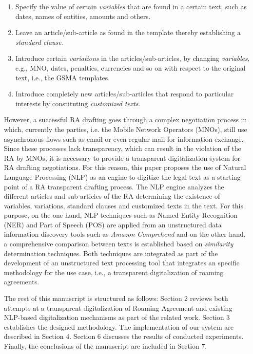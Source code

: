 \documentclass[conference]{style/IEEEtran}
\begin{document}
\begin{enumerate}
\item Specify the value of certain \textit{variables} that are found in a certain text, such as dates, names of entities, amounts and others.

\item Leave an article/sub-article as found in the template thereby establishing a \textit{standard clause}.

\item Introduce certain \textit{variations} in the articles/sub-articles, by changing \textit{variables}, e.g., MNO, dates, penalties, currencies and so on with respect to the original text, i.e., the GSMA templates.

\item Introduce completely new articles/sub-articles that respond to particular interests by constituting \textit{customized texts}.

\end{enumerate}

However, a successful RA drafting goes through a complex negotiation process in which, currently the parties, i.e. the Mobile Network Operators (MNOs), still use asynchronous flows such as email or even regular mail for information exchange. Since these processes lack transparency, which can result in the violation of the RA by MNOs, it is necessary to provide a transparent digitalization system for RA drafting negotiations. For this reason, this paper proposes the use of Natural Language Processing (NLP) as an engine to digitize the legal text as a starting point of a RA transparent drafting process. The NLP engine analyzes the different articles and sub-articles of the RA determining the existence of variables, variations, standard clauses and customized texts in the text. For this purpose, on the one hand, NLP techniques such as Named Entity Recognition (NER) and Part of Speech (POS) are applied from an unstructured data information discovery tools such as \textit{Amazon Comprehend} and on the other hand, a comprehensive comparison between texts is established based on \textit{similarity} determination techniques. Both techniques are integrated as part of the development of an unstructured text processing tool that integrates an specific methodology for the use case, i.e., a transparent digitalization of roaming agreements.

The rest of this manuscript is structured as follows: Section 2 reviews both attempts at a transparent digitalization of Roaming Agreement and existing NLP-based digitalization mechanisms as part of the related work. Section 3 establishes the designed methodology. The implementation of our system are described in Section 4. Section 6 discusses the results of conducted experiments. Finally, the conclusions of the manuscript are included in Section 7.
\end{document}
